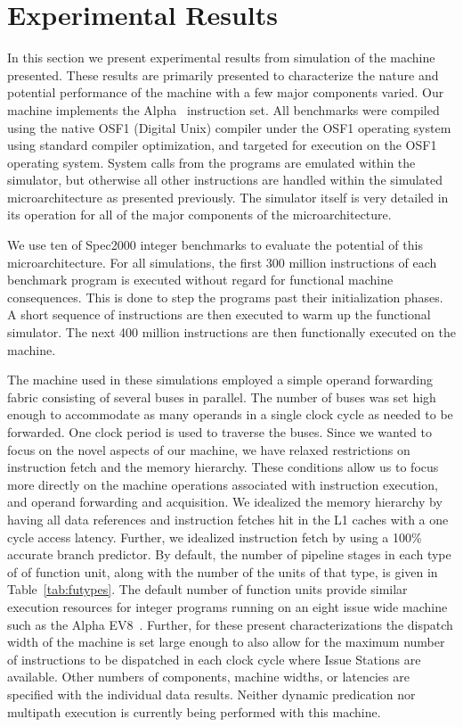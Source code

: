 \documentclass[10pt,dvips]{article}
\begin{document}
\section{Experimental Results}
%
In this section we present experimental results from simulation
of the machine presented.
These results are primarily presented to characterize the
nature and potential performance of the machine with a few major
components varied.
Our machine implements the Alpha~\cite{Bannon95} instruction set.
All benchmarks were compiled using the native OSF1 (Digital Unix)
compiler under the OSF1 operating system 
using standard compiler optimization,
and targeted for execution on the OSF1 operating system.
System calls from the programs are emulated within the simulator,
but otherwise all other instructions are handled
within the simulated microarchitecture as presented previously.
The simulator itself is very detailed in its operation for
all of the major components of the microarchitecture.

We use ten of Spec2000 integer benchmarks to evaluate the potential
of this microarchitecture. 
For all simulations, the first 300 million instructions of each
benchmark program is executed without regard for functional machine
consequences.  
This is done to step the programs past their initialization
phases.
A short sequence of instructions are then
executed to warm up the functional simulator.
The next 400 million instructions are then
functionally executed on the machine.

The machine used in these simulations
employed a simple operand forwarding fabric consisting of
several buses in parallel.  The number of buses was set high
enough to accommodate as many operands in a single clock cycle as
needed to be forwarded.
One clock period is used to traverse the buses.
Since we wanted to focus on the novel aspects of our machine,
we have relaxed restrictions on instruction fetch and
the memory hierarchy.
These conditions allow us to focus more directly on the
machine operations associated with instruction execution, and
operand forwarding and acquisition.
We idealized the memory hierarchy
by having all data references and instruction fetches hit in 
the L1 caches with a one cycle
access latency.
Further, we idealized instruction fetch by using a 100\% accurate
branch predictor.
By default, the number of pipeline stages in each type of
of function unit, along with the number of the units of that
type, is given in Table~\ref{tab:futypes}.
The default number of function units provide similar
execution resources for integer programs running on an
eight issue wide machine such as the Alpha EV8~\cite{jain01eveight}.
Further, for these present characterizations the dispatch width
of the machine is set large enough to also allow for the maximum
number of instructions to be dispatched in each clock cycle where
Issue Stations are available.
Other numbers of components, machine widths, or latencies are
specified with the individual data results.
Neither dynamic predication nor multipath execution
is currently being performed with this machine.
%
%
\end{document}
